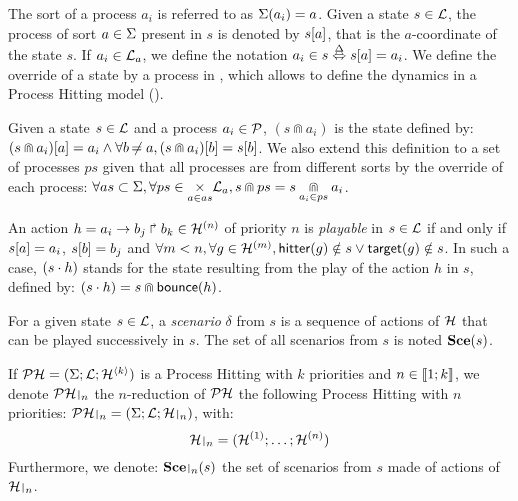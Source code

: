 \noindent
The sort of a process $a_i$ is referred to as $\Sigma(a_i) = a$.
Given a state $s\in \mathcal{L}$, the process of sort $a \in \Sigma$ present in $s$ is denoted by ${s[a]}$, that is the $a$-coordinate of the state $s$.
If $a_i \in \mathcal{L}_a$, we define the notation $a_i \in s \stackrel{\Delta}\Leftrightarrow {s[a]} = a_i$.
We define the override of a state by a process in , which allows to define the dynamics in a Process Hitting model ().
\begin{definition}
\label{def:statecap}
  Given a state $s \in \mathcal{L}$ and a process $a_i \in \mathcal{P}$, $(s \Cap a_i)$ is the state defined by:
  ${(s \Cap a_i)[a]} = a_i \wedge \forall b \not\nobreak\mkern -2mu = a, {(s \Cap a_i)[b]} = {s[b]}$.
  We also extend this definition to a set of processes $ps$ given that all processes are from different sorts by the override of each process:
  $\forall as \subset \Sigma, \forall ps \in \underset{a \in as}{\times} \mathcal{L}_a, s \Cap ps = s \underset{a_i \in ps}{\Cap} a_i$.
\end{definition}
\begin{definition}
\label{def:play}
  An action $h = a_i\rightarrow b_j\Rsh b_k \in \mathcal{H}^{(n)}$ of priority $n$ is \emph{playable} in $s \in \mathcal{L}$
  if and only if ${s[a]} = a_i$, ${s[b]} = b_j$ and $\forall m < n, \forall g \in \mathcal{H}^{(m)}, \mathsf{hitter}(g) \notin s \vee \mathsf{target}(g) \notin s$.
  In such a case, $(s \cdot h)$ stands for the state resulting from the play of the action $h$ in $s$, defined by: $(s \cdot h) = s \Cap \mathsf{bounce}(h)$.
\end{definition}
  For a given state $s \in \mathcal{L}$,
  a \emph{scenario} $\delta$ from $s$ is a sequence of actions of $\mathcal{H}$ that can be played successively in $s$.
  The set of all scenarios from $s$ is noted $\mathbf{Sce}(s)$.

\begin{definition} 
  If $\mathcal{PH} = (\Sigma; \mathcal{L}; \mathcal{H}^{\langle k \rangle})$ is a Process Hitting with $k$ priorities and $n \in \llbracket 1; k \rrbracket$, we denote $\restriction{\PH}{n}$  the $n$-reduction of $\mathcal{PH}$ the following Process Hitting with $n$ priorities:
  $\restriction{\PH}{n} = (\PHs; \PHl; \restriction{\PHa}{n})$,
  with:
  $$\restriction{\PHa}{n} = (\PHa^{(1)}; \dots; \PHa^{(n)})$$
  Furthermore, we denote: $\restriction{\Sce}{n}(s)$ the set of scenarios from $s$ made of actions of $\restriction{\PHa}{n}$.
\end{definition}



